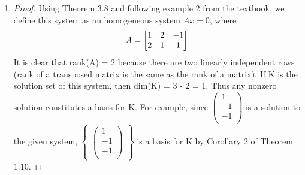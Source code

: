 \documentclass[11pt]{scrartcl}
\begin{document}
\begin{enumerate}[label=\alph*.]
	\item{
		\begin{proof}
			Using Theorem 3.8 and following example 2 from the textbook, we define this system as an homogeneous system $Ax=0$, where 
			\[
				A=
			\begin{bmatrix}
				1 & 2 & -1\\
				2 & 1 & 1\\
			\end{bmatrix}\\
			\]
			It is clear that rank(A) = 2 because there are two linearly independent rows (rank of a transposed matrix is the same as the rank of a matrix).
			If K is	the solution set of this system, then dim(K) = 3 - 2 = 1. 
			Thus any nonzero solution constitutes a basis for K. For example, since
			$
			\begin{pmatrix}
				1\\
				-1\\
				-1\\
			\end{pmatrix}
			$
			is a solution to the given system,
			$
			\begin{Bmatrix}
				\begin{pmatrix}
					1\\
					-1\\
					-1\\
				\end{pmatrix}
			\end{Bmatrix}
			$ 
			is a basis for K by Corollary 2 of Theorem 1.10.
		\end{proof}
	}
	

\end{enumerate}
\end{document}
